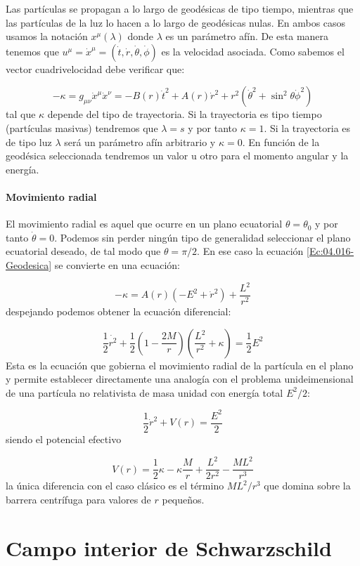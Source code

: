 \documentclass[12pt,a4paper]{book}
\numberwithin{equation}{section}
\numberwithin{figure}{section}
\newcommand{\parentesis}[1]{\left( #1  \right)}
\begin{document}
Las partículas se propagan a lo largo de geodésicas de tipo tiempo, mientras que las partículas de la luz lo hacen a lo largo de geodésicas nulas. En ambos casos usamos la notación $x^\mu (\lambda)$ donde $\lambda$ es un parámetro afín. De esta manera tenemos que $u^\mu = \dot{x}^\mu=(\dot{t},\dot{r},\dot{\theta},\dot{\phi})$ es la velocidad asociada. Como sabemos el vector cuadrivelocidad debe verificar que:


\begin{equation}
- \kappa =g_{\mu \nu } \dot{x}^\mu \dot{x}^\nu = - B(r)\dot{t}^2 + A(r) \dot{r}^2 + r^2 (\dot{\theta}^2 + \sin^2 \theta \dot{\phi}^2) \label{Ec:04.016-Geodesica}
\end{equation}
tal que $\kappa$ depende del tipo de trayectoria. Si la trayectoria es tipo tiempo (partículas masivas) tendremos que $\lambda=s$ y por tanto $\kappa=1$. Si la trayectoria es de tipo luz $\lambda$ será un parámetro afín arbitrario y $\kappa=0$. En función de la geodésica seleccionada tendremos un valor u otro para el momento angular y la energía. 

\subsubsection{Movimiento radial}

El movimiento radial es aquel que ocurre en un plano ecuatorial $\theta=\theta_0$ y por tanto $\dot{\theta}=0$. Podemos sin perder ningún tipo de generalidad seleccionar el plano ecuatorial deseado, de tal modo que $\theta =  \pi /2$. En ese caso la ecuación \ref{Ec:04.016-Geodesica} se convierte en una ecuación:

\begin{equation}
- \kappa = A(r) (-E^2+\dot{r}^2) + \frac{L^2}{r^2}
\end{equation}
despejando podemos obtener la ecuación diferencial:

\begin{equation}
\frac{1}{2} \dot{r^2} +\frac{1}{2} \parentesis{1-\frac{2M}{r}} \parentesis{\frac{L^2}{r^2}+\kappa} = \frac{1}{2} E^2
\end{equation}
Esta es la ecuación que gobierna el movimiento radial de la partícula en el plano y permite establecer directamente una analogía con el problema unideimensional de una partícula no relativista de masa unidad con energía total $E^2/2$:

\begin{equation}
\frac{1}{2} \dot{r}^2 + V(r) = \frac{E^2}{2}
\end{equation}
siendo el potencial efectivo

\begin{equation}
V(r) = \frac{1}{2} \kappa - \kappa \frac{M}{r} + \frac{L^2}{2r^2} - \frac{ML^2}{r^3}
\end{equation}
la única diferencia con el caso clásico es el término $ML^2 /r^3$ que domina sobre la barrera centrífuga para valores de $r$ pequeños. 

\newpage

\chapter{Campo interior de Schwarzschild}
\end{document}
